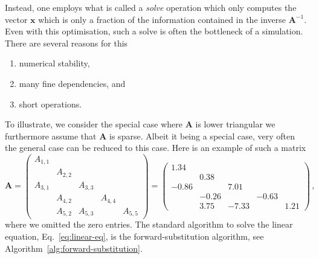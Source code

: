\documentclass[oneside,reqno, a4paper]{amsart}
\numberwithin{equation}{section}
\newcommand{\vect}[1]{{\boldsymbol{#1}}}
\begin{document}
Instead, one employs what is called a \emph{solve} operation which only computes the vector $\vect{x}$ which is only a fraction of the information contained in the inverse $\vect{A}^{-1}$. Even with this optimisation, such a solve is often the bottleneck of a simulation. There are several reasons for this
\begin{enumerate}
	\item numerical stability,
	\item many fine dependencies, and
	\item short operations.
\end{enumerate}
To illustrate, we consider the special case where $\vect{A}$ is lower triangular we furthermore assume that $\vect{A}$ is sparse. Albeit it being a special case, very often the general case can be reduced to this case. Here is an example of such a matrix
\begin{equation} \label{eq:sparse-lower-triangular-matrix-example}
	\vect{A} = 
	\begin{pmatrix}
	A_{1,1} & & & &  \\
	 & A_{2,2} & & &  \\
	A_{3,1} & & A_{3,3} & &  \\
	 & A_{4,2} & & A_{4,4} &  \\
	 & A_{5,2} & A_{5,3} & & A_{5,5}	
	\end{pmatrix}
	=
	\begin{pmatrix}
		1.34 & & & & \\
		& 0.38 & & & \\
		-0.86 & & 7.01 & & \\
		& -0.26 & & -0.63 & \\
		& 3.75 & -7.33 & & 1.21  
	\end{pmatrix} \,,
\end{equation}
where we omitted the zero entries. The standard algorithm to solve the linear equation, Eq.~\eqref{eq:linear-eq}, is the forward-substitution algorithm, see Algorithm~\ref{alg:forward-substitution}.
\end{document}
